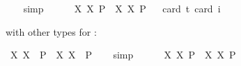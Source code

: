 \begin{isabellebody}
\isadelimproof
\ \ %
\endisadelimproof
%
\isatagproof
{}\isamarkupfalse%
\ simp%
\endisatagproof
{\isafoldproof}%
%
\isadelimproof
%
\endisadelimproof
\ \ \ \ \isanewline
{}\isamarkupfalse%
\ {\isachardoublequoteopen}{\isasymlfloor}{\isacharparenleft}{\isasymlambda}X{\isachardot}\ \isactrlbold {\isasymdiamond}\isactrlbold {\isasymexists}X{\isacharparenright}\ \isactrlbold {\isasymdown}{\isacharparenleft}P{\isacharcolon}{\isacharcolon}{\isasymup}{\isasymlangle}{\isasymzero}{\isasymrangle}{\isacharparenright}\ \isactrlbold {\isasymrightarrow}\ \isactrlbold {\isasymdiamond}{\isacharparenleft}{\isacharparenleft}{\isasymlambda}X{\isachardot}\ \isactrlbold {\isasymexists}X{\isacharparenright}\ \isactrlbold {\isasymdown}P{\isacharparenright}{\isasymrfloor}{\isachardoublequoteclose}\isanewline
\ \ \isamarkupfalse%
{\isacharbrackleft}card\ {\isacharprime}t{\isacharequal}{}{\isacharcomma}\ card\ i{\isacharequal}{}{\isacharbrackright}%
\isadelimproof
\ %
\endisadelimproof
%
\isatagproof
{}\isamarkupfalse%
\ %
%
\endisatagproof
{\isafoldproof}%
%
\isadelimproof
%
\endisadelimproof
%
\begin{isamarkuptext}%
with other types for :%
\end{isamarkuptext}\isamarkuptrue%
\isamarkupfalse%
\ {\isachardoublequoteopen}{\isasymlfloor}{\isacharparenleft}{\isasymlambda}X{\isachardot}\ \isactrlbold {\isasymdiamond}\isactrlbold {\isasymexists}X{\isacharparenright}\ \ {\isacharparenleft}P{\isacharcolon}{\isacharcolon}{\isasymup}{\isasymlangle}{\isasymup}{\isasymzero}{\isasymrangle}{\isacharparenright}\ \isactrlbold {\isasymrightarrow}\ \isactrlbold {\isasymdiamond}{\isacharparenleft}{\isacharparenleft}{\isasymlambda}X{\isachardot}\ \isactrlbold {\isasymexists}X{\isacharparenright}\ \ P{\isacharparenright}{\isasymrfloor}{\isachardoublequoteclose}%
\isadelimproof
\ \ %
\endisadelimproof
%
\isatagproof
{}\isamarkupfalse%
\ simp%
\endisatagproof
{\isafoldproof}%
%
\isadelimproof
%
\endisadelimproof
\ \ \ \ \isanewline
{}\isamarkupfalse%
\ {\isachardoublequoteopen}{\isasymlfloor}{\isacharparenleft}{\isasymlambda}X{\isachardot}\ \isactrlbold {\isasymdiamond}\isactrlbold {\isasymexists}X{\isacharparenright}\ \isactrlbold {\isasymdown}{\isacharparenleft}P{\isacharcolon}{\isacharcolon}{\isasymup}{\isasymlangle}{\isasymup}{\isasymzero}{\isasymrangle}{\isacharparenright}\ \isactrlbold {\isasymrightarrow}\ \isactrlbold {\isasymdiamond}{\isacharparenleft}{\isacharparenleft}{\isasymlambda}X{\isachardot}\ \isactrlbold {\isasymexists}X{\isacharparenright}\ \isactrlbold {\isasymdown}P{\isacharparenright}{\isasymrfloor}{\isachardoublequoteclose}\ \isanewline

\end{isabellebody}
